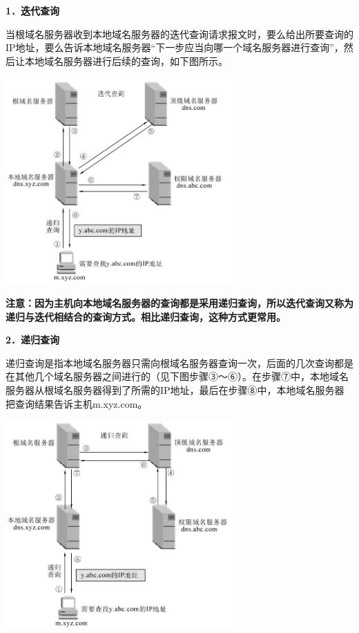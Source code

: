 \textbf{{1．迭代查询}}

当根域名服务器收到本地域名服务器的迭代查询请求报文时，要么给出所要查询的IP地址，要么告诉本地域名服务器``下一步应当向哪一个域名服务器进行查询''，然后让本地域名服务器进行后续的查询，如下图所示。

\includegraphics[width=3.43750in,height=3.10417in]{png-jpeg-pics/E26E2735B3A59AA406F10A089E6A8C0E.png}

{\textbf{注意：}}\textbf{因为主机向本地域名服务器的查询都是采用递归查询，所以迭代查询又称为递归与迭代相结合的查询方式。相比递归查询，这种方式更常用。}

\textbf{{2．递归查询}}

递归查询是指本地域名服务器只需向根域名服务器查询一次，后面的几次查询都是在其他几个域名服务器之间进行的（见下图步骤③～⑥）。在步骤⑦中，本地域名服务器从根域名服务器得到了所需的IP地址，最后在步骤⑧中，本地域名服务器把查询结果告诉主机m.xyz.com。

\includegraphics[width=3.43750in,height=3.12500in]{png-jpeg-pics/8BC04566CF2B949C03E49D646B151CB9.png}
